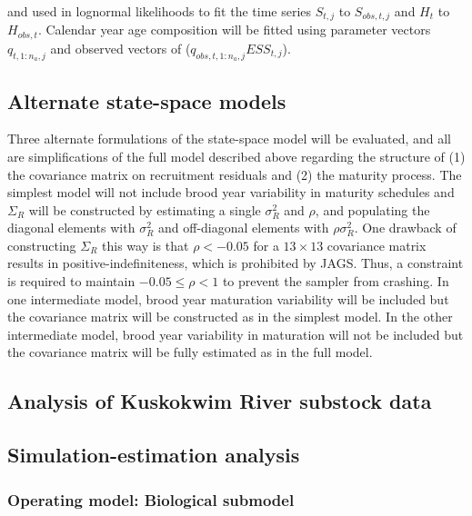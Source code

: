 \documentclass[12pt,]{book}
\theoremstyle{definition}
\theoremstyle{definition}
\theoremstyle{definition}
\theoremstyle{remark}
\begin{document}
\noindent
and used in lognormal likelihoods to fit the time series \(S_{t,j}\) to
\(S_{obs,t,j}\) and \(H_t\) to \(H_{obs,t}\). Calendar year age
composition will be fitted using parameter vectors \(q_{t,1:n_a,j}\) and
observed vectors of (\(q_{obs,t,1:n_a,j} ESS_{t,j}\)).

\subsection{Alternate state-space
models}\label{alternate-state-space-models}

Three alternate formulations of the state-space model will be evaluated,
and all are simplifications of the full model described above regarding
the structure of (1) the covariance matrix on recruitment residuals and
(2) the maturity process. The simplest model will not include brood year
variability in maturity schedules and \(\Sigma_R\) will be constructed
by estimating a single \(\sigma_R^2\) and \(\rho\), and populating the
diagonal elements with \(\sigma_R^2\) and off-diagonal elements with
\(\rho \sigma_R^2\). One drawback of constructing \(\Sigma_R\) this way
is that \(\rho < -0.05\) for a \(13 \times 13\) covariance matrix
results in positive-indefiniteness, which is prohibited by JAGS. Thus, a
constraint is required to maintain \(-0.05 \le \rho < 1\) to prevent the
sampler from crashing. In one intermediate model, brood year maturation
variability will be included but the covariance matrix will be
constructed as in the simplest model. In the other intermediate model,
brood year variability in maturation will not be included but the
covariance matrix will be fully estimated as in the full model.

\subsection{Analysis of Kuskokwim River substock
data}\label{analysis-of-kuskokwim-river-substock-data}

\subsection{Simulation-estimation
analysis}\label{simulation-estimation-analysis}

\subsubsection{Operating model: Biological
submodel}\label{operating-model-biological-submodel}
\end{document}
